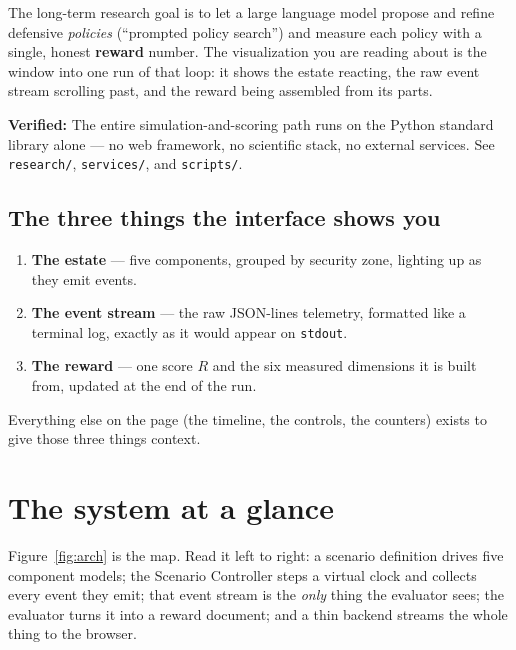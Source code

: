 \documentclass[11pt]{article}
\newcommand{\code}[1]{\texttt{\small #1}}
\newcommand{\file}[1]{\textcolor{mfpurple}{\texttt{\small #1}}}
\newcommand{\keyfact}[1]{%
  \par\vspace{4pt}\noindent
  \colorbox{panel}{\parbox{\dimexpr\linewidth-2\fboxsep}{\small\textbf{\textcolor{mfcyan}{Verified:}} #1}}%
  \par\vspace{4pt}}
\begin{document}
The long-term research goal is to let a large language model propose and refine
defensive \emph{policies} (``prompted policy search'') and measure each policy
with a single, honest \textbf{reward} number. The visualization you are reading
about is the window into one run of that loop: it shows the estate reacting, the
raw event stream scrolling past, and the reward being assembled from its parts.

\keyfact{The entire simulation-and-scoring path runs on the Python standard
library alone --- no web framework, no scientific stack, no external services.
See \file{research/}, \file{services/}, and \file{scripts/}.}

\subsection{The three things the interface shows you}

\begin{enumerate}[leftmargin=1.4em]
  \item \textbf{The estate} --- five components, grouped by security zone,
        lighting up as they emit events.
  \item \textbf{The event stream} --- the raw JSON-lines telemetry, formatted
        like a terminal log, exactly as it would appear on \code{stdout}.
  \item \textbf{The reward} --- one score $R$ and the six measured dimensions
        it is built from, updated at the end of the run.
\end{enumerate}

Everything else on the page (the timeline, the controls, the counters) exists to
give those three things context.

\section{The system at a glance}
\label{sec:architecture}

Figure~\ref{fig:arch} is the map. Read it left to right: a scenario definition
drives five component models; the Scenario Controller steps a virtual clock and
collects every event they emit; that event stream is the \emph{only} thing the
evaluator sees; the evaluator turns it into a reward document; and a thin backend
streams the whole thing to the browser.
\end{document}
